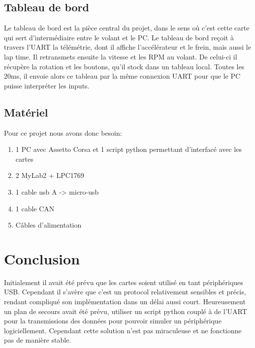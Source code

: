 \documentclass[french, 11pt]{article}
\begin{document}
        
        \subsection{Tableau de bord}

        Le tableau de bord est la pièce central du projet, dans le sens où c'est cette carte qui sert d'intermédiaire entre le volant et le PC. Le tableau de bord reçoit à travers l'UART la télémétrie, dont il affiche l'accélérateur et le frein, mais aussi le lap time. Il retransmets ensuite la vitesse et les RPM au volant. De celui-ci il récupère la rotation et les boutons, qu'il stock dans un tableau local. Toutes les 20ms, il envoie alors ce tableau par la même connexion UART pour que le PC puisse interpréter les inputs. 

        \subsection{Matériel}    

        Pour ce projet nous avons donc besoin:

        \begin{enumerate}
            \item 1 PC avec Assetto Corsa et 1 script python permettant d'interfacé avec les cartes
            \item 2 MyLab2 + LPC1769
            \item 1 cable usb A -> micro-usb
            \item 1 cable CAN
            \item Câbles d'alimentation
        \end{enumerate}

    \section{Conclusion}

    Initialement il avait été prévu que les cartes soient utilisé en tant périphériques USB. Cependant il s'avère que c'est un protocol relativement sensibles et précis, rendant compliqué son implémentation dans un délai aussi court. Heureusement un plan de secours avait été prévu, utiliser un script python couplé à de l'UART pour la transmissions des données pour pouvoir simuler un périphérique logiciellement. Cependant cette solution n'est pas miraculeuse et ne fonctionne pas de manière stable.
\end{document}
